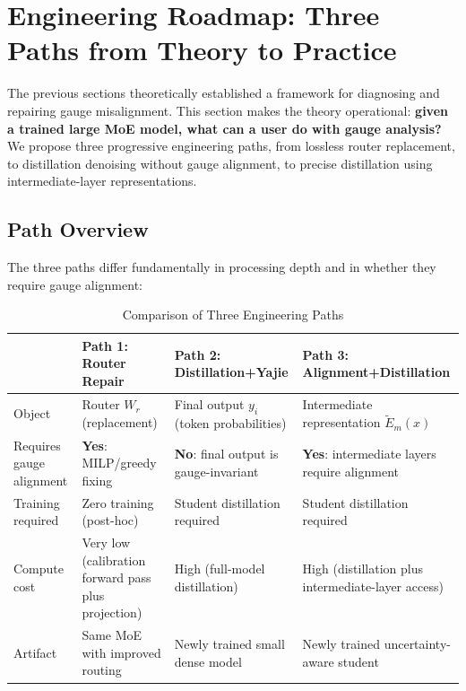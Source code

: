 \documentclass[12pt,a4paper]{article}
\theoremstyle{remark}
\begin{document}
\section{Engineering Roadmap: Three Paths from Theory to Practice}

The previous sections theoretically established a framework for diagnosing and repairing gauge misalignment. This section makes the theory operational: \textbf{given a trained large MoE model, what can a user do with gauge analysis?} We propose three progressive engineering paths, from lossless router replacement, to distillation denoising without gauge alignment, to precise distillation using intermediate-layer representations.

\subsection{Path Overview}

The three paths differ fundamentally in processing depth and in whether they require gauge alignment:

\begin{table}[H]
\centering
\caption{Comparison of Three Engineering Paths}
\label{tab:three_paths}
\begin{tabular}{p{2.2cm} p{4.2cm} p{4.2cm} p{4.2cm}}
\toprule
\textbf{} & \textbf{Path 1: Router Repair} & \textbf{Path 2: Distillation+Yajie} & \textbf{Path 3: Alignment+Distillation} \\
\midrule
Object & Router $W_r$ (replacement) & Final output $y_i$ (token probabilities) & Intermediate representation $\tilde{E}_m(x)$ \\
Requires gauge alignment & \textbf{Yes}: MILP/greedy fixing & \textbf{No}: final output is gauge-invariant & \textbf{Yes}: intermediate layers require alignment \\
Training required & Zero training (post-hoc) & Student distillation required & Student distillation required \\
Compute cost & Very low (calibration forward pass plus projection) & High (full-model distillation) & High (distillation plus intermediate-layer access) \\
Artifact & Same MoE with improved routing & Newly trained small dense model & Newly trained uncertainty-aware student \\
\bottomrule
\end{tabular}
\end{table}
\end{document}
